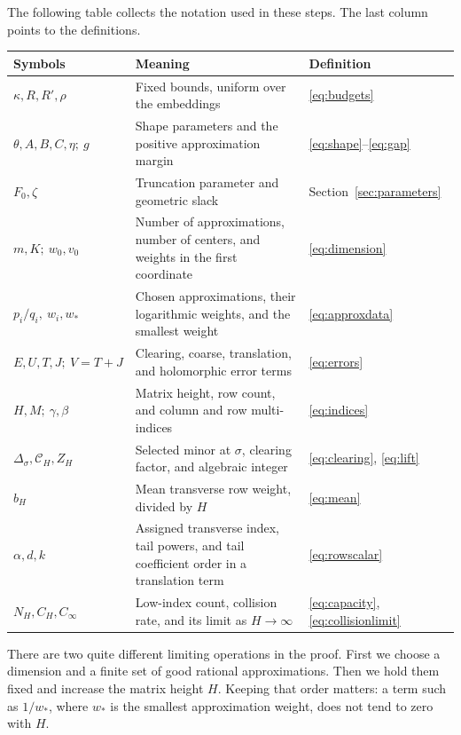 \documentclass[11pt]{article}
\theoremstyle{definition}
\theoremstyle{remark}
\theoremstyle{plain}
\begin{document}
The following table collects the notation used in these steps. The last
column points to the definitions.
\begin{center}
\small
\begin{tabular}{@{}>{\raggedright\arraybackslash}p{}>{\raggedright\arraybackslash}p{}>{\raggedright\arraybackslash}p{}@{}}
\toprule
Symbols & Meaning & Definition\\
\midrule
\(\kappa,R,R',\rho\) & Fixed bounds, uniform over the embeddings & \eqref{eq:budgets}\\[3pt]
\(\theta,A,B,C,\eta;\ g\) & Shape parameters and the positive approximation margin & \eqref{eq:shape}--\eqref{eq:gap}\\[3pt]
\(F_0,\zeta\) & Truncation parameter and geometric slack & Section~\ref{sec:parameters}\\[3pt]
\(m,K;\ w_0,v_0\) & Number of approximations, number of centers, and weights in the first coordinate & \eqref{eq:dimension}\\[3pt]
\(p_i/q_i,\ w_i,w_*\) & Chosen approximations, their logarithmic weights, and the smallest weight & \eqref{eq:approxdata}\\[3pt]
\(E,U,T,J;\ V=T+J\) & Clearing, coarse, translation, and holomorphic error terms & \eqref{eq:errors}\\[3pt]
\(H,M;\ \gamma,\beta\) & Matrix height, row count, and column and row multi-indices & \eqref{eq:indices}\\[3pt]
\(\Delta_\sigma,\mathscr C_H,Z_H\) & Selected minor at \(\sigma\), clearing factor, and algebraic integer & \eqref{eq:clearing}, \eqref{eq:lift}\\[3pt]
\(b_H\) & Mean transverse row weight, divided by \(H\) & \eqref{eq:mean}\\[3pt]
\(\alpha,d,k\) & Assigned transverse index, tail powers, and tail coefficient order in a translation term & \eqref{eq:rowscalar}\\[3pt]
\(N_H,C_H,C_\infty\) & Low-index count, collision rate, and its limit as \(H\to\infty\) & \eqref{eq:capacity}, \eqref{eq:collisionlimit}\\
\bottomrule
\end{tabular}
\end{center}

There are two quite different limiting operations in the proof. First we
choose a dimension and a finite set of good rational approximations.
Then we hold them fixed and increase the matrix height \(H\). Keeping
that order matters: a term such as \(1/w_*\), where \(w_*\) is the
smallest approximation weight, does not tend to zero with \(H\).
\end{document}
